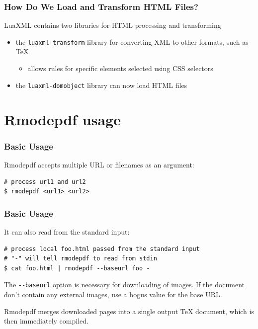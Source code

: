 \begin{frame}[fragile]
  \frametitle{How Do We Load and Transform HTML Files?}
  LuaXML contains two libraries for HTML processing and transforming
  \begin{itemize}
    \item the \verb|luaxml-transform| library for converting XML to other formats, such as \TeX
      \begin{itemize}
        \item allows rules for specific elements selected using CSS selectors
      \end{itemize}
    \item the \verb|luaxml-domobject| library can now load HTML files
  \end{itemize}
\end{frame}

\section{Rmodepdf usage}

\begin{frame}[fragile]
  \frametitle{Basic Usage}

  Rmodepdf accepts multiple URL or filenames as an argument:

\begin{verbatim}
# process url1 and url2
$ rmodepdf <url1> <url2>
\end{verbatim}
\end{frame}

\begin{frame}[fragile]
  \frametitle{Basic Usage}
It can also read from the standard input:

\begin{verbatim}
# process local foo.html passed from the standard input
# "-" will tell rmodepdf to read from stdin
$ cat foo.html | rmodepdf --baseurl foo - 
\end{verbatim}
\end{frame}

The \verb|--baseurl| option is necessary for downloading of images. If the document don't contain any external images, 
use a bogus value for the base URL.

Rmodepdf merges downloaded pages into a single output TeX document, which is then immediately compiled.


